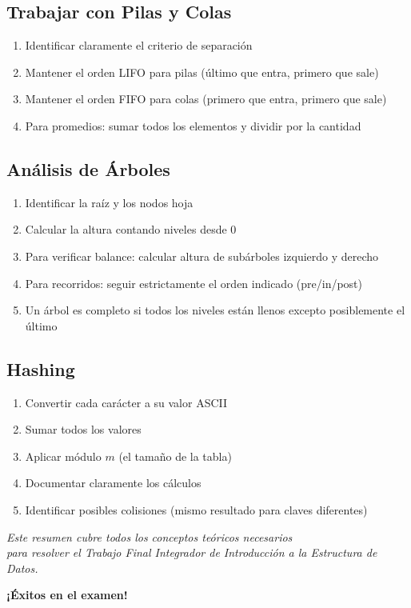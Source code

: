 \documentclass[12pt,a4paper]{article}
\begin{document}
\subsection{Trabajar con Pilas y Colas}
\begin{enumerate}
    \item Identificar claramente el criterio de separación
    \item Mantener el orden LIFO para pilas (último que entra, primero que sale)
    \item Mantener el orden FIFO para colas (primero que entra, primero que sale)
    \item Para promedios: sumar todos los elementos y dividir por la cantidad
\end{enumerate}

\subsection{Análisis de Árboles}
\begin{enumerate}
    \item Identificar la raíz y los nodos hoja
    \item Calcular la altura contando niveles desde 0
    \item Para verificar balance: calcular altura de subárboles izquierdo y derecho
    \item Para recorridos: seguir estrictamente el orden indicado (pre/in/post)
    \item Un árbol es completo si todos los niveles están llenos excepto posiblemente el último
\end{enumerate}

\subsection{Hashing}
\begin{enumerate}
    \item Convertir cada carácter a su valor ASCII
    \item Sumar todos los valores
    \item Aplicar módulo $m$ (el tamaño de la tabla)
    \item Documentar claramente los cálculos
    \item Identificar posibles colisiones (mismo resultado para claves diferentes)
\end{enumerate}

\vfill

\begin{center}
\textit{Este resumen cubre todos los conceptos teóricos necesarios\\para resolver el Trabajo Final Integrador de Introducción a la Estructura de Datos.}

\vspace{1em}

\textbf{¡Éxitos en el examen!}
\end{center}
\end{document}

